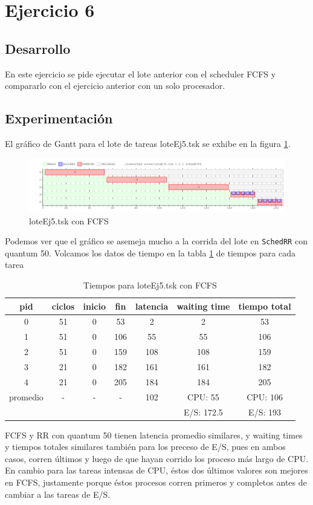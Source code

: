 \section{Ejercicio 6}


\subsection{Desarrollo}
En este ejercicio se pide ejecutar el lote anterior con el scheduler FCFS
y compararlo con el ejercicio anterior con un solo procesador.


\subsection{Experimentación}
El gráfico de Gantt para el lote de tareas loteEj5.tsk se exhibe en la figura \ref{fig:ej6FCFS}. \par
\begin{figure}[H]
  \centering
    \includegraphics[width=1.1\textwidth]{imagenes/Ej6.png}
  \caption{loteEj5.tsk con FCFS}
  \label{fig:ej6FCFS}
\end{figure}
Podemos ver que el gráfico se asemeja mucho a la corrida del lote en \verb|SchedRR| con quantum 50. Volcamos los datos de tiempo en la tabla \ref{tab:ej6FCFS} de tiempos para cada tarea\par

\begin{table}
\centering
\begin{tabular}{ | c | c | c | c | c | c | c | }
  \hline			
  pid & ciclos & inicio & fin & latencia & waiting time & tiempo total  \\
  \hline
0 & 51 & 0 & 53 & 2 & 2 & 53\\
1 & 51 & 0 & 106 & 55 & 55 & 106\\
2 & 51 & 0 & 159 & 108 & 108 & 159\\
3 & 21 & 0 & 182 & 161 & 161 & 182\\
4 & 21 & 0 & 205 & 184 & 184 & 205\\
  \hline
promedio & - & - & - & 102 & CPU: 55  & CPU: 106 \\
                & &  &  &  & E/S: 172.5  & E/S: 193\\
\hline
\end{tabular}
\caption{Tiempos para loteEj5.tsk con FCFS}\label{tab:ej6FCFS}
\end{table}

FCFS y RR con quantum 50 tienen latencia promedio similares, y waiting times y tiempos totales similares también para los preceso de E/S, pues en ambos casos, corren últimos y luego de que hayan corrido los proceso más largo de CPU. En cambio para las tareas intensas de CPU, éstos dos últimos valores son mejores en FCFS, justamente porque éstos procesos corren primeros y completos antes de cambiar a las tareas de E/S.\par